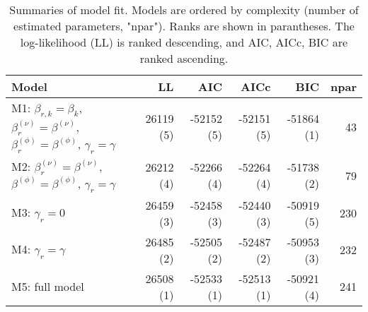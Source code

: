 \begin{table}[ht]
\centering
\begingroup\fontsize{9pt}{10pt}\selectfont
\begin{tabular}{l|rrrrr}
  \hline
Model & LL & AIC & AICc & BIC & npar \\ 
  \hline
M1: $\beta_{r,k} = \beta_{k}$, $\beta_{r}^{(\nu)} = \beta^{(\nu)}$, $\beta_{r}^{(\phi)} = \beta^{(\phi)}$, $\gamma_r = \gamma$ & 26119 (5) & -52152 (5) & -52151 (5) & -51864 (1) & 43 \\ 
  M2: $\beta_{r}^{(\nu)} = \beta^{(\nu)}$, $\beta^{(\phi)} = \beta^{(\phi)}$, $\gamma_r = \gamma$ & 26212 (4) & -52266 (4) & -52264 (4) & -51738 (2) & 79 \\ 
  M3: $\gamma_r = 0$ & 26459 (3) & -52458 (3) & -52440 (3) & -50919 (5) & 230 \\ 
  M4: $\gamma_r = \gamma$ & 26485 (2) & -52505 (2) & -52487 (2) & -50953 (3) & 232 \\ 
  M5: full model & 26508 (1) & -52533 (1) & -52513 (1) & -50921 (4) & 241 \\ 
   \hline
\end{tabular}
\endgroup
\caption{Summaries of model fit.
             Models are ordered by complexity (number of estimated parameters, "npar").
             Ranks are shown in parantheses.
             The log-likelihood (LL) is ranked descending,
             and AIC, AICc, BIC are ranked ascending.} 
\label{tab:mBetafit}
\end{table}
